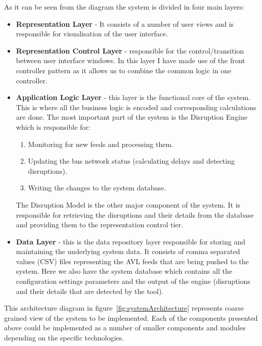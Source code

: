 As it can be seen from the diagram the system is divided in four main layers:
\begin{itemize}
	\item \textbf{Representation Layer} - It consists of a number of user views and is responsible for visualisation of the user interface. 
	\item \textbf{Representation  Control Layer} - responsible for the control/transition between user interface windows. In this layer I have made use of the front controller pattern \cite{fowler2003patterns} as it allows us to combine the common logic in one controller.
	\item \textbf{Application Logic Layer} -  this layer is the functional core of the system. This is where all the business logic is encoded and corresponding calculations are done. The most important part of the system is the Disruption Engine which is responsible for:
	\begin{enumerate}
		\item Monitoring for new feeds and processing them.
		\item Updating the bus network status (calculating delays and detecting disruptions).
		\item Writing the changes to the system database.
	\end{enumerate}
	The Disruption Model is the other major component of the system. It is responsible for retrieving the disruptions and their details from the database and providing them to the representation control tier.
	\item \textbf{Data Layer} - this is the data repository layer responsible for storing and maintaining the underlying system data. It consists of comma separated values (CSV) files representing the AVL feeds that are being pushed to the system. Here we also have the system database which contains all the configuration settings parameters and the output of the engine (disruptions and their details that are detected by the tool).
\end{itemize}
This architecture diagram in figure~\ref{fig:systemArchitecture} represents coarse grained view of the system to be implemented. Each of the components presented above could be implemented as a number of smaller components and modules depending on the specific technologies.


